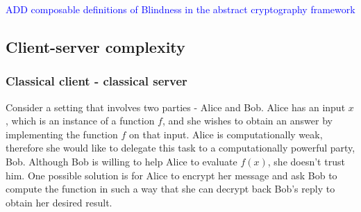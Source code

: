 \textcolor{blue}{ADD composable definitions of Blindness in the abstract cryptography framework}
\subsection{Client-server complexity} 

\subsubsection{Classical client - classical server}%
Consider a setting that involves two parties - Alice and Bob. Alice has an input $x$, which is an instance of a function $f$, and she wishes to obtain an answer by implementing the function $f$ on that input. Alice is computationally weak, therefore she would like to delegate this task to a computationally powerful party, Bob. Although Bob is willing to help Alice to evaluate $f(x)$, she doesn't trust him. One possible solution is for Alice to encrypt her message and ask Bob to compute the function in such a way that she can decrypt back Bob's reply to obtain her desired result. 

